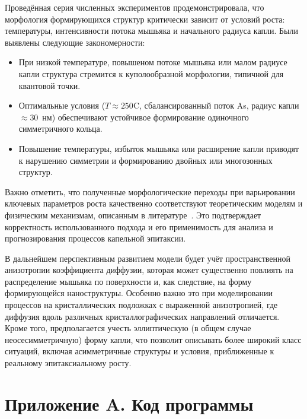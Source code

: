\documentclass[14pt,oneside]{extarticle}
\begin{document}
Проведённая серия численных экспериментов продемонстрировала, что морфология формирующихся структур критически зависит от условий роста: температуры, интенсивности потока мышьяка и начального радиуса капли. Были выявлены следующие закономерности:

\begin{itemize}
    \item При низкой температуре, повышеном потоке мышьяка или малом радиусе капли структура стремится к куполообразной морфологии, типичной для квантовой точки.
    \item Оптимальные условия ($T \approx 250$\textdegree C, сбалансированный поток As, радиус капли $\approx 30$~нм) обеспечивают устойчивое формирование одиночного симметричного кольца.
    \item Повышение температуры, избыток мышьяка или расширение капли приводят к нарушению симметрии и формированию двойных или многозонных структур.
\end{itemize}

Важно отметить, что полученные морфологические переходы при варьировании ключевых параметров роста качественно соответствуют теоретическим моделям и физическим механизмам, описанным в литературе~\cite{zhou2013,mano2005nano,fan2023evaporation}. Это подтверждает корректность использованного подхода и его применимость для анализа и прогнозирования процессов капельной эпитаксии.

В дальнейшем перспективным развитием модели будет учёт пространственной анизотропии коэффициента диффузии, которая может существенно повлиять на распределение мышьяка по поверхности и, как следствие, на форму формирующейся наноструктуры. Особенно важно это при моделировании процессов на кристаллических подложках с выраженной анизотропией, где диффузия вдоль различных кристаллографических направлений отличается. Кроме того, предполагается учесть эллиптическую (в общем случае неосесимметричную) форму капли, что позволит описывать более широкий класс ситуаций, включая асимметричные структуры и условия, приближенные к реальному эпитаксиальному росту.

\clearpage
{}
\printbibliography


\clearpage
\appendix

\section*{Приложение A. Код программы}
\end{document}
